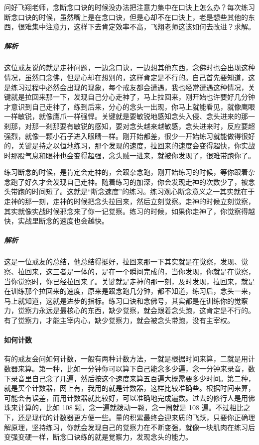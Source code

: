 \begin{case}[练习过程中的问题]
    问好飞翔老师，念断念口诀的时候没办法把注意力集中在口诀上怎么办？每次练习断念口诀的时候，虽然嘴上是在念口诀，但是心却不在口诀上，老是想些其他的东西，很难集中注意力，这样下去肯定效率不高，飞翔老师这该如何去改进？求解。
    \subparagraph{解析} 这位戒友说的就是走神问题，一边念口诀，一边想其他东西，念佛时也会出现这种情况，虽然口念佛，但是心却在想别的，这样肯定是不行的。自己首先要知道，这是练习过程中必然会出现的现象，每个戒友都会遭遇，我也经常遭遇这种情况，关键就是拉回来那一下，发现自己分心走神了，马上拉回来，刚开始也许要好几分钟才意识到自己走神了，练到后来，分心的念头一出现，你马上就能看见，就像鹰眼一样敏锐，就像鹰爪一样强悍。关键就是要敏锐地感知念头入侵、念头进来的那一刹那，对那一刹那要有敏锐的感知，要对念头越来越敏感，念头进来时，反应要超强烈，就像一颗小石子进入眼睛一样。刚开始都差，很少一开始练习就能做得很好的，关键是持之以恒地练习，那个发现的速度，拉回来的速度会变得超快，你实战时那股气息和眼神也会变得超强，念头贼一进来，就被你发现了，很难带跑你了。
\end{case}

\begin{case}[练习过程中的问题]
    练习断念的时候，是肯定会走神的，会跟杂念跑，刚开始练习的时候，等你跟着杂念跑了好久才会发现自己走神。随着练习的加深，你会发现走神的次数少了，被念头带跑的时间短了。这就是“断念速度”的练习。练习观心断念意义之一其实就在于走神的那一刻，走神的时候把念头拉回来，然后立刻觉察。走神的时候立刻觉察，其实就像实战时候邪念来了你一记觉察。练习的时候，如果你走神了，你觉察得越快，实战里断念的速度也会越快。
    \subparagraph{解析} 这是一位戒友的总结，他总结得挺好，拉回来那一下其实就是在觉察，发现、觉察、拉回来，这三者是一体的，是在一个瞬间完成的，当你发现，你就是在觉察，当你觉察时，你已经拉回来了。关键就是走神的那一刻，及时发现，拉回来，就是在训练那个拉回来的速度，原来是跟念跑几分钟，都不知道，练习后，念头一来，马上就知道，这就是进步的指标。练习口诀和念佛号，其实都是在训练你的觉察力，觉察力永远是最核心的东西，缺少觉察，就会跟着念头跑，这肯定是不行的。有了觉察力，才能主宰内心，缺少觉察力，就会被念头带跑，没有主宰权。
\end{case}

\paragraph{如何计数}

有的戒友会问如何计数，一般有两种计数方法，一就是根据时间来算，二就是用计数器来算。第一种，比如一分钟你可以算下自己能念多少遍，念一分钟来录音，数下录音里自己念了几遍，然后按这个速度来算五百遍大概需要多少时间。第二种，就是买个计数器，网上有，我用的就是计数器，这样比较准确些。根据时间来算，可能会有误差，而用计数器就比较好，可以准确地完成遍数。过去的修行人是用佛珠来计算的，比如 108 颗，念一遍就拨动一颗，念一圈就是 108 遍。不过相比之下，还是现代的计数器更方便一些。量的积累最终会迎来质的飞跃，只要你正确理解原理，坚持练习，你就会发现自己的觉察力在不断变强，就像一块肌肉在练习后变强变硬一样，断念口诀练的就是觉察力，发现念头的能力。

